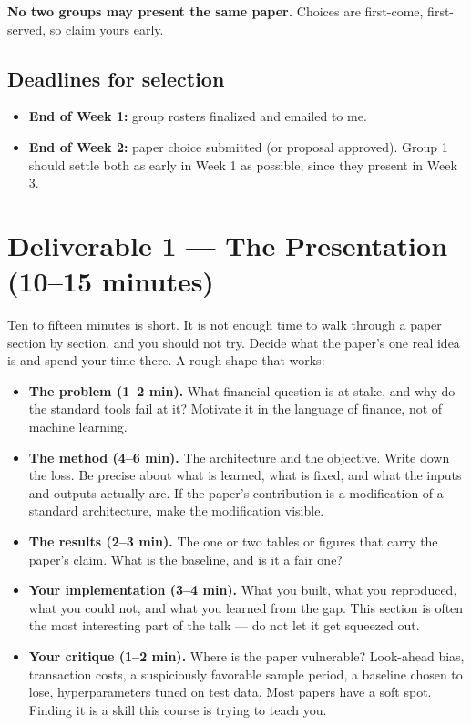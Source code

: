 \documentclass[11pt]{article}
\begin{document}
\noindent
\textbf{No two groups may present the same paper.} Choices are first-come,
first-served, so claim yours early.

\subsection*{Deadlines for selection}

\begin{itemize}
  \item \textbf{End of Week 1:} group rosters finalized and emailed to me.
  \item \textbf{End of Week 2:} paper choice submitted (or proposal approved).
    Group 1 should settle both as early in Week 1 as possible, since they
    present in Week 3.
\end{itemize}

\section*{Deliverable 1 --- The Presentation (10--15 minutes)}

Ten to fifteen minutes is short. It is not enough time to walk through a paper
section by section, and you should not try. Decide what the paper's one real
idea is and spend your time there. A rough shape that works:

\begin{itemize}
  \item \textbf{The problem (1--2 min).} What financial question is at stake,
    and why do the standard tools fail at it? Motivate it in the language of
    finance, not of machine learning.
  \item \textbf{The method (4--6 min).} The architecture and the objective.
    Write down the loss. Be precise about what is learned, what is fixed, and
    what the inputs and outputs actually are. If the paper's contribution is a
    modification of a standard architecture, make the modification visible.
  \item \textbf{The results (2--3 min).} The one or two tables or figures that
    carry the paper's claim. What is the baseline, and is it a fair one?
  \item \textbf{Your implementation (3--4 min).} What you built, what you
    reproduced, what you could not, and what you learned from the gap. This
    section is often the most interesting part of the talk --- do not let it
    get squeezed out.
  \item \textbf{Your critique (1--2 min).} Where is the paper vulnerable?
    Look-ahead bias, transaction costs, a suspiciously favorable sample
    period, a baseline chosen to lose, hyperparameters tuned on test data. Most
    papers have a soft spot. Finding it is a skill this course is trying to
    teach you.
\end{itemize}
\end{document}
